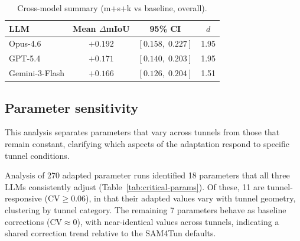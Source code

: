 \documentclass[a4paper,fleqn]{cas-dc}
\begin{document}
\begin{table}[ht]
\caption{Cross-model summary (m+s+k vs baseline, overall).}\label{tab:cross-model}
\begin{tabular*}{\tblwidth}{@{} l c c c @{}}
\toprule
LLM & Mean $\Delta$mIoU & 95\% CI & \mbox{$d$} \\
\midrule
Opus-4.6 & $+0.192$ & $[0.158,\; 0.227]$ & 1.95 \\
GPT-5.4 & $+0.171$ & $[0.140,\; 0.203]$ & 1.95 \\
Gemini-3-Flash & $+0.166$ & $[0.126,\; 0.204]$ & 1.51 \\
\bottomrule
\end{tabular*}
\end{table}

\subsection{Parameter sensitivity}\label{sec:sensitivity}

This analysis separates parameters that vary across tunnels from those that remain constant, clarifying which aspects of the adaptation respond to specific tunnel conditions.

Analysis of 270 adapted parameter runs identified 18 parameters that all three LLMs consistently adjust (Table~\ref{tab:critical-params}). Of these, 11 are tunnel-responsive ($\text{CV} \geq 0.06$), in that their adapted values vary with tunnel geometry, clustering by tunnel category. The remaining 7 parameters behave as baseline corrections ($\text{CV} \approx 0$), with near-identical values across tunnels, indicating a shared correction trend relative to the SAM4Tun defaults.
\end{document}
